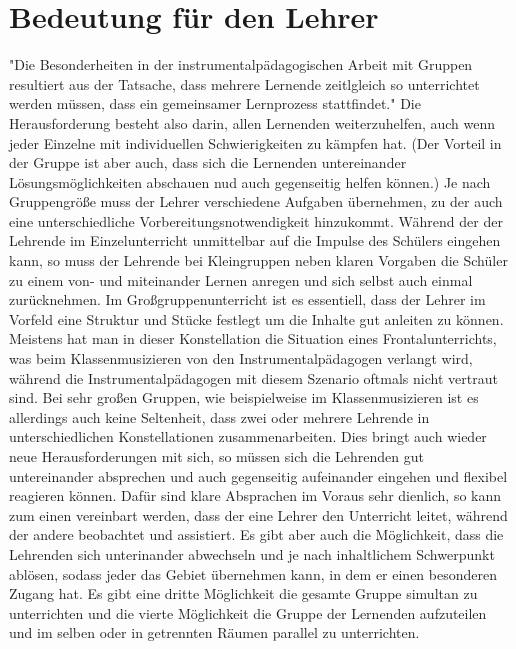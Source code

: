 \section{Bedeutung für den Lehrer}

"Die Besonderheiten in der instrumentalpädagogischen Arbeit mit Gruppen
resultiert aus der Tatsache, dass mehrere Lernende zeitlgleich so unterrichtet
werden müssen, dass ein gemeinsamer Lernprozess stattfindet."
\autocite[221]{busch:grundwissen_instrumentalpaedagogik} Die Herausforderung
besteht also darin, allen Lernenden weiterzuhelfen, auch wenn jeder Einzelne mit
individuellen Schwierigkeiten zu kämpfen hat. (Der Vorteil in der Gruppe ist
aber auch, dass sich die Lernenden untereinander Lösungsmöglichkeiten abschauen
nud auch gegenseitig helfen können.) Je nach Gruppengröße muss der Lehrer
verschiedene Aufgaben übernehmen, zu der auch eine unterschiedliche
Vorbereitungsnotwendigkeit hinzukommt. Während der der Lehrende im
Einzelunterricht unmittelbar auf die Impulse des Schülers eingehen kann, so muss
der Lehrende bei Kleingruppen neben klaren Vorgaben die Schüler zu einem von-
und miteinander Lernen anregen und sich selbst auch einmal zurücknehmen. Im
Großgruppenunterricht ist es essentiell, dass der Lehrer im Vorfeld eine
Struktur und Stücke festlegt um die Inhalte gut anleiten zu
können.\autocite[220]{busch:grundwissen_instrumentalpaedagogik} Meistens hat man
in dieser Konstellation die Situation eines Frontalunterrichts, was beim
Klassenmusizieren von den Instrumentalpädagogen verlangt wird, während die
Instrumentalpädagogen mit diesem Szenario oftmals nicht vertraut sind. Bei sehr
großen Gruppen, wie beispielweise im Klassenmusizieren ist es allerdings auch
keine Seltenheit, dass zwei oder mehrere Lehrende in unterschiedlichen
Konstellationen zusammenarbeiten. Dies bringt auch wieder neue Herausforderungen
mit sich, so müssen sich die Lehrenden gut untereinander absprechen und auch
gegenseitig aufeinander eingehen und flexibel reagieren können. Dafür sind klare
Absprachen im Voraus sehr dienlich, so kann zum einen vereinbart werden, dass
der eine Lehrer den Unterricht leitet, während der andere beobachtet und
assistiert. Es gibt aber auch die Möglichkeit, dass die Lehrenden sich
unterinander abwechseln und je nach inhaltlichem Schwerpunkt ablösen, sodass
jeder das Gebiet übernehmen kann, in dem er einen besonderen Zugang hat. Es gibt
eine dritte Möglichkeit die gesamte Gruppe simultan zu unterrichten und die
vierte Möglichkeit die Gruppe der Lernenden aufzuteilen und im selben oder in
getrennten Räumen parallel zu unterrichten.
\autocite{cook s. 461} 

